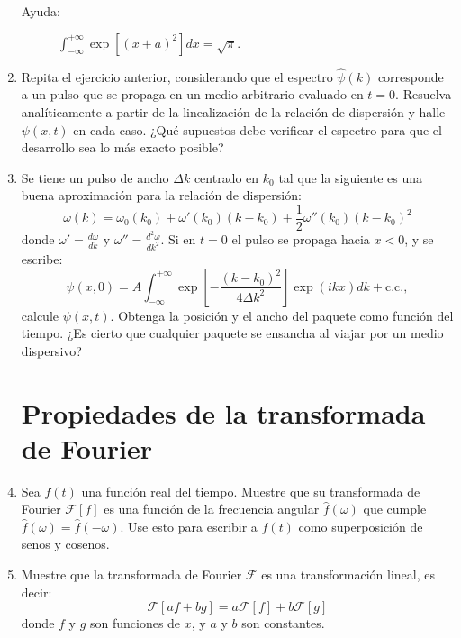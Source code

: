 \documentclass[11pt,spanish]{article}
\begin{document}
\begin{enumerate}
\begin{enumerate}
    \end{enumerate}

    \begin{description}
        \item [{Ayuda:}] $\int_{-\infty}^{+\infty}\exp\left[(x+a)^{2}\right]dx=\sqrt{\pi}$.
    \end{description}


    \item Repita el ejercicio anterior, considerando que el espectro
    $\hat{\psi}(k)$ corresponde a un pulso que se propaga en un medio arbitrario
    evaluado en $t=0$. Resuelva analíticamente a partir de la linealización de
    la relación de dispersión y halle $\psi(x,t)$ en cada caso. ¿Qué supuestos
    debe verificar el espectro para que el desarrollo sea lo más exacto posible?


    \item Se tiene un pulso de ancho $\Delta k$ centrado en $k_{0}$ tal que
    la siguiente es una buena aproximación para la relación de dispersión:
    \[
    \omega(k)=\omega_{0}(k_{0})+\omega'(k_{0})(k-k_{0})+\frac{1}{2}\omega''(k_{0})(k-k_{0})^{2}
    \]
    donde $\omega' = \frac{d \omega}{dk}$ y $\omega'' = \frac{d^2 \omega}{dk^2}$.
    Si en $t=0$ el pulso se propaga hacia $x<0$, y se escribe:
    \[
    \psi(x,0)=A\int_{-\infty}^{+\infty}\exp\left[-\frac{(k-k_{0})^{2}}{4\Delta k^{2}}\right]\exp\left(ikx\right)dk+ \text{c.c.},
    \]
    calcule $\psi(x,t)$. Obtenga la posición y el ancho del paquete
    como función del tiempo. ¿Es cierto que cualquier paquete se ensancha al
    viajar por un medio dispersivo?


\section*{Propiedades de la transformada de Fourier}    
    
    
    \item Sea $f(t)$ una función real del tiempo. Muestre que su transformada de
    Fourier $\mathcal{F}[f]$ es una función de la frecuencia angular
    $\hat{f}(\omega)$  que cumple $\hat{f}(\omega)=\hat{f}(-\omega)$. Use esto
    para escribir a $f(t)$ como superposición de senos y cosenos.


    \item Muestre que la transformada de Fourier $\mathcal{F}$ es una
    transformación lineal, es decir:
    \[
    \mathcal{F}[af+bg]=a\mathcal{F}[f]+b\mathcal{F}[g]
    \]
    donde $f$ y $g$ son funciones de $x$, y $a$ y $b$ son constantes.



\end{enumerate}
\end{document}

